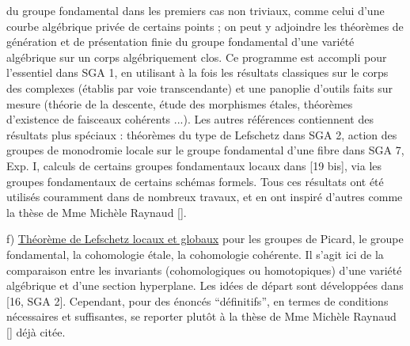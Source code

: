 
du groupe fondamental dans les premiers cas non triviaux,
comme celui d'une courbe algébrique privée de certains
points ; on peut y adjoindre les théorèmes de génération
et de présentation finie du groupe fondamental d'une
variété algébrique sur un corps algébriquement clos.
Ce programme est accompli pour l'essentiel dans SGA 1,
en utilisant à la fois les résultats classiques sur le
corps des complexes (établis par voie transcendante)
et une panoplie d'outils faits sur mesure (théorie de
la descente, étude des morphismes étales, théorèmes
d'existence de faisceaux cohérents ...). Les autres
références contiennent des résultats plus spéciaux :
théorèmes du type de Lefschetz dans SGA 2, action des
groupes de monodromie locale sur le groupe fondamental
d'une fibre dans SGA 7, Exp. I, calculs de certains
groupes fondamentaux locaux dans [19 bis], via les groupes
fondamentaux de certains schémas formels. Tous ces
résultats ont été utilisés couramment dans de nombreux
travaux, et en ont inspiré d'autres comme la thèse de
Mme Michèle Raynaud [\unsure{$\ast$}].

f) \uline{Théorème de Lefschetz locaux et globaux} pour les
groupes de Picard, le groupe fondamental, la cohomologie
étale, la cohomologie cohérente. Il s'agit ici de la
comparaison entre les invariants (cohomologiques ou
homotopiques) d'une variété algébrique et d'une section
hyperplane. Les idées de départ sont développées dans
[16, SGA 2]. Cependant, pour des énoncés ``définitifs'',
en termes de conditions nécessaires et suffisantes, se
reporter plutôt à la thèse de Mme Michèle Raynaud [\unsure{$\ast$}]
déjà citée.

